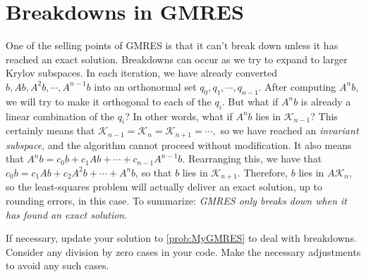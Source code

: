 \section*{Breakdowns in GMRES}
One of the selling points of GMRES is that it can't break down unless it has reached an exact solution.
Breakdowns can occur as we try to expand to larger Krylov subspaces.
In each iteration, we have already converted $b,Ab,A^{2}b,\cdots, A^{n-1}b$ into an orthonormal set $q_0,q_1,\cdots,q_{n-1}$.
After computing $A^nb,$ we will try to make it orthogonal to each of the $q_i$.
But what if $A^{n}b$ is already a linear combination of the $q_i$? In other words, what if $A^{n}b$ lies in $\mathcal{K}_{n-1}$?
This certainly means that $\mathcal{K}_{n-1}=\mathcal{K}_n=\mathcal{K}_{n+1}=\cdots,$ so we have reached an \emph{invariant subspace}, and the algorithm cannot proceed without modification.
It also means that $A^{n}b = c_0 b + c_1 A b + \cdots + c_{n-1}A^{n-1}b$.
Rearranging this, we have that $c_0 b = c_1 A b + c_2 A^{2} b + \cdots + A^{n}b$, so that $b$ lies in $\mathcal{K}_{n+1}$.
Therefore, $b$ lies in $A\mathcal{K}_n$, so the least-squares problem will actually deliver an exact solution, up to rounding errors, in this case.
To summarize: \emph{GMRES only breaks down when it has found an exact solution}.

\begin{problem}
If necessary, update your solution to \ref{prob:MyGMRES} to deal with breakdowns.
Consider any division by zero cases in your code.  Make the necessary adjustments to avoid any such cases.
\label{prob:GMRES3}
\end{problem}

